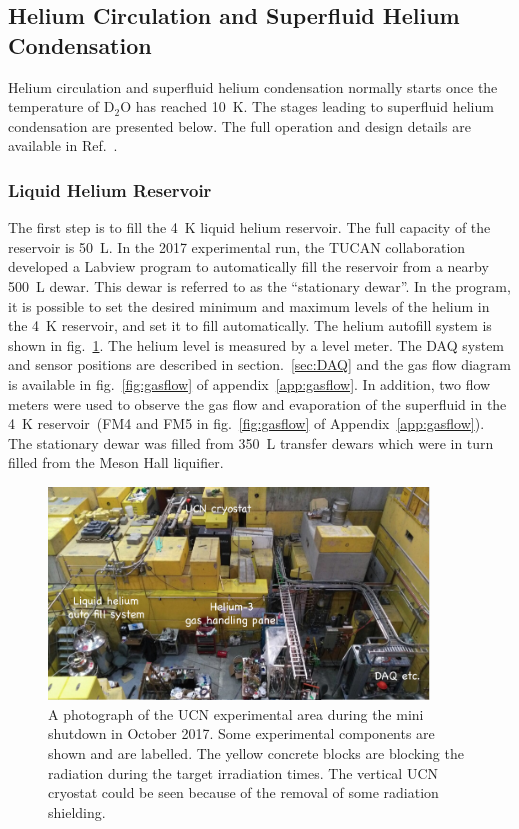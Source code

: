 \subsection{Helium Circulation and Superfluid Helium Condensation}
Helium circulation and superfluid helium condensation normally starts
once the temperature of D$_2$O has reached 10~K. The stages leading to
superfluid helium condensation are presented below. The full operation
and design details are available in Ref.~\cite{matsumiya_thesis}.

\subsubsection{Liquid Helium Reservoir}
The first step is to fill the 4~K liquid helium reservoir. The full
capacity of the reservoir is 50~L. In the 2017 experimental run, the
TUCAN collaboration developed a Labview program to automatically fill
the reservoir from a nearby 500~L dewar. This dewar is referred to as
the ``stationary dewar''. In the program, it is possible to set the
desired minimum and maximum levels of the helium in the 4~K reservoir,
and set it to fill automatically. The helium autofill system is shown
in fig.~\ref{fig:ucnarea}. The helium level is measured by a level
meter. The DAQ system and sensor positions are described in
section.~\ref{sec:DAQ} and the gas flow diagram is available in
fig.~\ref{fig:gasflow} of appendix~\ref{app:gasflow}. In addition, two
flow meters were used to observe the gas flow and evaporation of the
superfluid in the 4~K reservoir~(FM4 and FM5 in fig.~\ref{fig:gasflow}
of Appendix~\ref{app:gasflow}). The stationary dewar was filled from
350~L transfer dewars which were in turn filled from the Meson Hall
liquifier.

\begin{figure}[h!]
  \centering
  \includegraphics[width=0.9\textwidth]{ucnarea.png}
  \caption[UCN experimental area during the mini shutdown in October
  2017]{A photograph of the UCN experimental area during the mini
    shutdown in October 2017. Some experimental components are shown
    and are labelled. The yellow concrete blocks are blocking the
    radiation during the target irradiation times. The vertical UCN
    cryostat could be seen because of the removal of some radiation
    shielding. }
  \label{fig:ucnarea}
\end{figure}


